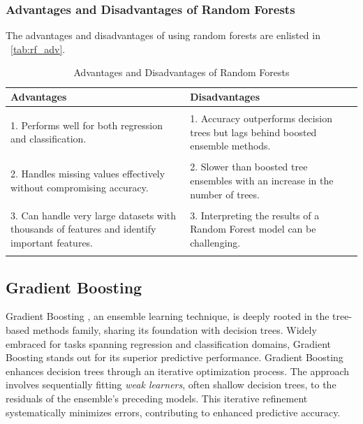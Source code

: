 \subsubsection{Advantages and Disadvantages of Random Forests}
The advantages and disadvantages of using random forests are enlisted in ~\autoref{tab:rf_adv}.
\begin{table}[H]
    \centering
    \caption{Advantages and Disadvantages of Random Forests}
    \label{tab:rf_adv}
    \begin{tabularx}{\textwidth}{X|X}
        \hline
        \textbf{Advantages}                                                                           & \textbf{Disadvantages}                                                           \\
        \hline                                                                                                                                                                           \\
        1. Performs well for both regression and classification.                                      & 1. Accuracy outperforms decision trees but lags behind boosted ensemble methods. \\ \\
        2. Handles missing values effectively without compromising accuracy.                          & 2. Slower than boosted tree ensembles with an increase in the number of trees.   \\ \\
        3. Can handle very large datasets with thousands of features and identify important features. & 3. Interpreting the results of a Random Forest model can be challenging.         \\ \\
        \hline
    \end{tabularx}
\end{table}
\FloatBarrier

\subsection{Gradient Boosting} \label{sec:gb}

Gradient Boosting \cite{zpz_gradient_boosting}, an ensemble learning technique, is deeply rooted in the tree-based methods family, sharing its foundation with decision trees.
Widely embraced for tasks spanning regression and classification domains, Gradient Boosting stands out for its superior predictive performance.
Gradient Boosting enhances decision trees through an iterative optimization process.
The approach involves sequentially fitting \textit{weak learners}, often shallow decision trees, to the residuals of the ensemble's preceding models.
This iterative refinement systematically minimizes errors, contributing to enhanced predictive accuracy.

